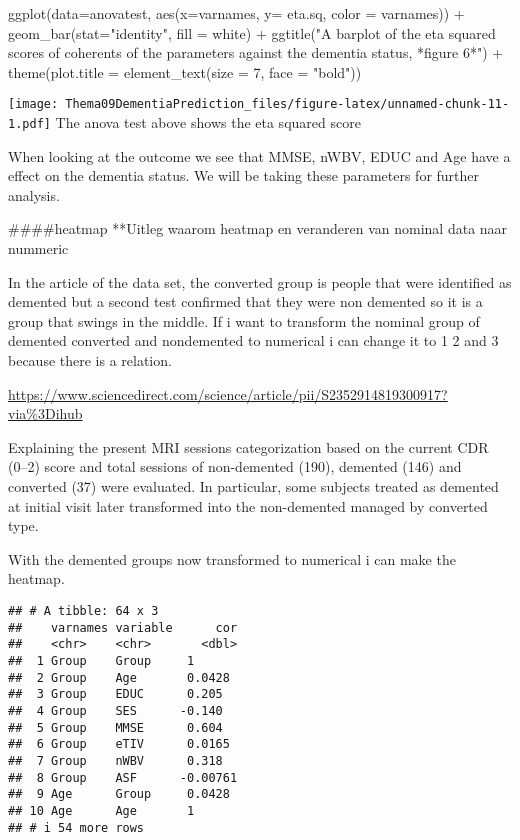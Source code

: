 \documentclass[
]{article}
\newenvironment{Shaded}{\begin{snugshade}}{\end{snugshade}}
\newcommand{\AttributeTok}[1]{\textcolor[rgb]{0.77,0.63,0.00}{#1}}
\newcommand{\DecValTok}[1]{\textcolor[rgb]{0.00,0.00,0.81}{#1}}
\newcommand{\FunctionTok}[1]{\textcolor[rgb]{0.00,0.00,0.00}{#1}}
\newcommand{\NormalTok}[1]{#1}
\newcommand{\SpecialCharTok}[1]{\textcolor[rgb]{0.00,0.00,0.00}{#1}}
\newcommand{\StringTok}[1]{\textcolor[rgb]{0.31,0.60,0.02}{#1}}
\begin{document}
\begin{Shaded}
\begin{Highlighting}[]
\FunctionTok{ggplot}\NormalTok{(}\AttributeTok{data=}\NormalTok{anovatest, }\FunctionTok{aes}\NormalTok{(}\AttributeTok{x=}\NormalTok{varnames, }\AttributeTok{y=}\NormalTok{ eta.sq, }\AttributeTok{color =}\NormalTok{ varnames)) }\SpecialCharTok{+}
  \FunctionTok{geom\_bar}\NormalTok{(}\AttributeTok{stat=}\StringTok{"identity"}\NormalTok{, }\AttributeTok{fill =} \StringTok{\textquotesingle{}white\textquotesingle{}}\NormalTok{) }\SpecialCharTok{+}
  \FunctionTok{ggtitle}\NormalTok{(}\StringTok{"A barplot of the eta squared scores of coherents of the parameters against the dementia status, *figure 6*"}\NormalTok{) }\SpecialCharTok{+} \FunctionTok{theme}\NormalTok{(}\AttributeTok{plot.title =} \FunctionTok{element\_text}\NormalTok{(}\AttributeTok{size =} \DecValTok{7}\NormalTok{, }\AttributeTok{face =} \StringTok{"bold"}\NormalTok{))}
\end{Highlighting}
\end{Shaded}

\texttt{[image: Thema09DementiaPrediction\_files/figure-latex/unnamed-chunk-11-1.pdf]}
The anova test above shows the eta squared score

When looking at the outcome we see that MMSE, nWBV, EDUC and Age have a
effect on the dementia status. We will be taking these parameters for
further analysis.

\#\#\#\#heatmap **Uitleg waarom heatmap en veranderen van nominal data
naar nummeric

In the article of the data set, the converted group is people that were
identified as demented but a second test confirmed that they were non
demented so it is a group that swings in the middle. If i want to
transform the nominal group of demented converted and nondemented to
numerical i can change it to 1 2 and 3 because there is a relation.

\url{https://www.sciencedirect.com/science/article/pii/S2352914819300917?via\%3Dihub}

Explaining the present MRI sessions categorization based on the current
CDR (0--2) score and total sessions of non-demented (190), demented
(146) and converted (37) were evaluated. In particular, some subjects
treated as demented at initial visit later transformed into the
non-demented managed by converted type.

With the demented groups now transformed to numerical i can make the
heatmap.

\begin{verbatim}
## # A tibble: 64 x 3
##    varnames variable      cor
##    <chr>    <chr>       <dbl>
##  1 Group    Group     1      
##  2 Group    Age       0.0428 
##  3 Group    EDUC      0.205  
##  4 Group    SES      -0.140  
##  5 Group    MMSE      0.604  
##  6 Group    eTIV      0.0165 
##  7 Group    nWBV      0.318  
##  8 Group    ASF      -0.00761
##  9 Age      Group     0.0428 
## 10 Age      Age       1      
## # i 54 more rows
\end{verbatim}
\end{document}
